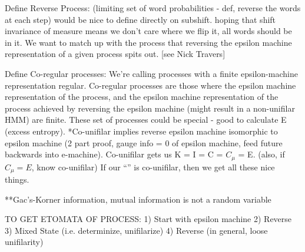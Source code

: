 \documentclass[prl,twocolumn,superscriptaddress,preprintnumbers,floatfix]{revtex4-1}
\begin{document}
Define Reverse Process: (limiting set of word probabilities - def, reverse the words at each step) would be nice to define directly on subshift. hoping that shift invariance of measure means we don't care where we flip it, all words should be in it.  We want to match up with the process that reversing the epsilon machine representation of a given process spits out. [see Nick Travers]

Define Co-regular processes: We're calling processes with a finite epsilon-machine representation regular. Co-regular processes are those where the epsilon machine representation of the process, and the epsilon machine representation of the process achieved by reversing the epsilon machine (might result in a non-unifilar HMM) are finite.  These set of processes could be special - good to calculate E (excess entropy).  *Co-unifilar implies reverse epsilon machine isomorphic to epsilon machine (2 part proof, gauge info = 0 of epsilon machine, feed future backwards into e-machine). Co-unifilar gets us K = I = C = $C_{\mu}$ = E.  (also, if $C_{\mu} = E$, know co-unifilar) If our ``\etomata'' is co-unifilar, then we get all these nice things.  

**Gac's-Korner information, mutual information is not a random variable 

TO GET ETOMATA OF PROCESS:
1) Start with epsilon machine
2) Reverse 
3) Mixed State (i.e. determinize, unifilarize)
4) Reverse (in general, loose unifilarity)




\end{document}
